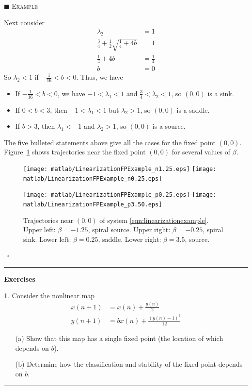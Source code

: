 \documentclass[reqno]{immbook}
\numberwithin{equation}{chapter}
\numberwithin{question}{section}
\numberwithin{theorem}{chapter}
\numberwithin{figure}{chapter}
\theoremstyle{definition}
\newtheorem{exercise}{}[section]
\newenvironment{xexample}%
{%

\medskip\noindent\addtocounter{example}{1}$\blacksquare$ \textsc{Example \theexample}\hspace*{1em}%
}%
{%
~\hfill$\square$

\medskip
}
\newenvironment{exercises}%
{%
\medskip\hrule\medskip\noindent\textbf{Exercises}%
}%
{%
\medskip\hrule
}
\begin{document}
\begin{xexample}
Next consider
\begin{equation}
\begin{split}
   \lambda_2 & = 1 \\
   \frac{3}{4} + \frac{1}{2} \sqrt{\frac{1}{4}+4b} & = 1 \\
   \frac{1}{4}+4b & = \frac{1}{4} \\
   b & = 0
\end{split}
\end{equation}
So $\lambda_2 < 1$ if $-\frac{1}{16} < b < 0$.
Thus, we have
\begin{itemize}
\item
If $-\frac{1}{16} < b < 0$, we have $-1 < \lambda_1 < 1$ and $\frac{3}{4} < \lambda_2 < 1$, so
$(0,0)$ is a sink.
\item
If $0 < b < 3$, then $-1 < \lambda_1 < 1$ but $\lambda_2 > 1$, so 
$(0,0)$ is a saddle.
\item
If $b > 3$, then $\lambda_1 < -1$ and $\lambda_2 > 1$, so
$(0,0)$ is a source.
\end{itemize}
The five bulleted statements above give all the cases for the
fixed point $(0,0)$.
Figure~\ref{fig:LinearizationFPExamples} shows trajectories
near the fixed point $(0,0)$ for several values of $\beta$.
\begin{figure}
\centerline{%
\texttt{[image: matlab/LinearizationFPExample\_n1.25.eps]}
\texttt{[image: matlab/LinearizationFPExample\_n0.25.eps]}
}
\centerline{%
\texttt{[image: matlab/LinearizationFPExample\_p0.25.eps]}
\texttt{[image: matlab/LinearizationFPExample\_p3.50.eps]}
}
\caption{Trajectories near $(0,0)$ of system
\eqref{eqn:linearizationexample}. Upper left: $\beta=-1.25$, spiral source.
Upper right: $\beta=-0.25$, spiral sink.
Lower left: $\beta=0.25$, saddle.
Lower right: $\beta=3.5$, source.}
\label{fig:LinearizationFPExamples}
\end{figure}
\end{xexample}

\begin{exercises}
\begin{exercise}
Consider the nonlinear map
\begin{equation}
\begin{split}
  x(n+1) & = x(n) + \frac{y(n)}{2} \\
  y(n+1) & = bx(n) + \frac{(y(n)-1)^3}{12}
\end{split}
\end{equation}
\begin{enumerate}
\item[(a)]
Show that this map has a single fixed point
(the location of which depends on $b$).
\item[(b)]
Determine how the classification and stability
of the fixed point depends on $b$.
\end{enumerate}
\end{exercise}
\end{exercises}
\end{document}
